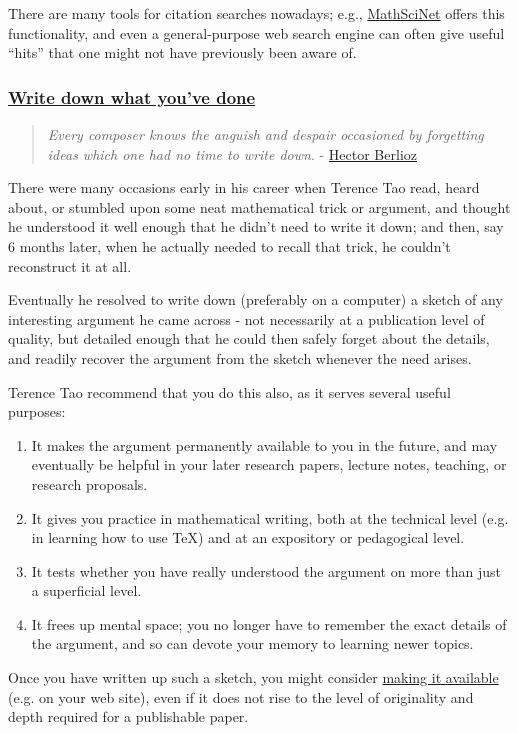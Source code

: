 \documentclass{article}
\begin{document}
There are many tools for citation searches nowadays; e.g., \href{http://www.ams.org/mathscinet/search.html}{MathSciNet} offers this functionality, and even a general-purpose web search engine can often give useful ``hits'' that one might not have previously been aware of.

\subsubsection{\href{https://terrytao.wordpress.com/career-advice/write-down-what-youve-done/}{Write down what you've done}}

\begin{quotation}
	\textit{Every composer knows the anguish and despair occasioned by forgetting ideas which one had no time to write down}. - \href{https://en.wikipedia.org/wiki/Hector_Berlioz}{Hector Berlioz}
\end{quotation}
There were many occasions early in his career when Terence Tao read, heard about, or stumbled upon some neat mathematical trick or argument, and thought he understood it well enough that he didn't need to write it down; and then, say 6 months later, when he actually needed to recall that trick, he couldn't reconstruct it at all.

Eventually he resolved to write down (preferably on a computer) a sketch of any interesting argument he came across - not necessarily at a publication level of quality, but detailed enough that he could then safely forget about the details, and readily recover the argument from the sketch whenever the need arises.

%
Terence Tao recommend that you do this also, as it serves several useful purposes:
\begin{enumerate}
	\item It makes the argument permanently available to you in the future, and may eventually be helpful in your later research papers, lecture notes, teaching, or research proposals.
	\item It gives you practice in mathematical writing, both at the technical level (e.g. in learning how to use TeX) and at an expository or pedagogical level.
	\item It tests whether you have really understood the argument on more than just a superficial level.
	\item It frees up mental space; you no longer have to remember the exact details of the argument, and so can devote your memory to learning newer topics.
\end{enumerate}
Once you have written up such a sketch, you might consider \href{https://terrytao.wordpress.com/career-advice/make-your-work-available/}{making it available} (e.g. on your web site), even if it does not rise to the level of originality and depth required for a publishable paper.
\end{document}
